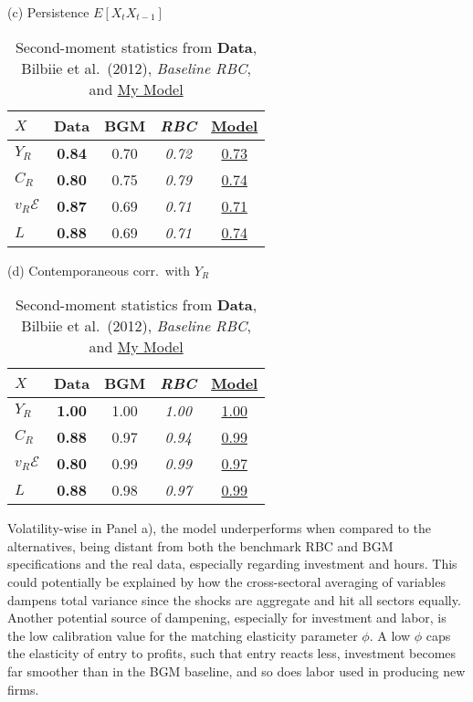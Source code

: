\documentclass[a4paper,12pt]{article} %
\numberwithin{equation}{section} %
\numberwithin{figure}{section}
\numberwithin{table}{section}
\newcommand{\dat}{\textbf}      %
\newcommand{\rbc}{\emph}        %
\newcommand{\mine}[1]{\underline{#1}}   %
\begin{document}
\begin{table}[H]
\begin{subtable}[t]{.48\textwidth}
  \centering
  \caption*{(c) Persistence $E[X_t X_{t-1}]$}
  \begin{tabular}{lcccc}
  \toprule
   $X$ & \dat{Data} & BGM & \rbc{RBC} & \mine{Model}\\
  \midrule
   $Y_R$      & \dat{0.84} & 0.70 & \rbc{0.72} & \mine{0.73}\\
   $C_R$      & \dat{0.80} & 0.75 & \rbc{0.79} & \mine{0.74}\\
   $v_R\mathcal{E}$   & \dat{0.87} & 0.69 & \rbc{0.71} & \mine{0.71}\\
   $L$        & \dat{0.88} & 0.69 & \rbc{0.71} & \mine{0.74}\\
  \bottomrule
  \end{tabular}
\end{subtable}
\hfill
\begin{subtable}[t]{.48\textwidth}
  \centering
  \caption*{(d) Contemporaneous corr.\ with $Y_R$}
  \begin{tabular}{lcccc}
  \toprule
   $X$ & \dat{Data} & BGM & \rbc{RBC} & \mine{Model}\\
  \midrule
   $Y_R$      & \dat{1.00} & 1.00 & \rbc{1.00} & \mine{1.00}\\
   $C_R$      & \dat{0.88} & 0.97 & \rbc{0.94} & \mine{0.99}\\
   $v_R\mathcal{E}$   & \dat{0.80} & 0.99 & \rbc{0.99} & \mine{0.97}\\
   $L$        & \dat{0.88} & 0.98 & \rbc{0.97} & \mine{0.99}\\
  \bottomrule
  \end{tabular}
\end{subtable}
\caption{Second-moment statistics from \dat{Data}, Bilbiie et al.\ (2012), 
\rbc{Baseline RBC}, and \mine{My Model}}
\label{tab:moments}
\end{table}

Volatility-wise in Panel a), the model underperforms when compared to the alternatives, being distant from both the
benchmark RBC and BGM specifications and the real data, especially regarding investment and hours. This could potentially
be explained by how the cross-sectoral averaging of variables dampens total variance since the shocks are aggregate and hit
all sectors equally. Another potential source of dampening, especially for investment and labor, is the low calibration value
for the matching elasticity parameter $\phi$. A low $\phi$ caps the elasticity of entry to profits, such that entry
reacts less, investment becomes far smoother than in the BGM baseline, and so does labor used in producing new firms. 
\end{document}
